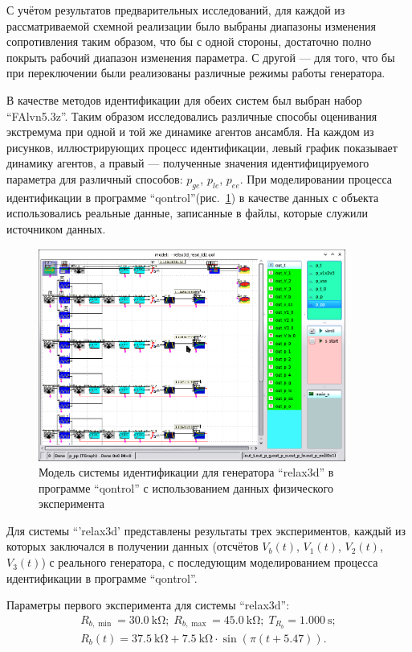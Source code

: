 С учётом результатов предварительных исследований,
для каждой из рассматриваемой схемной реализации было выбраны
диапазоны изменения сопротивления таким образом, что бы
с одной стороны,
достаточно полно покрыть рабочий диапазон изменения параметра.
С другой --- для того, что бы при переключении были реализованы
различные режимы работы генератора.

В качестве методов идентификации для обеих систем был выбран набор
``FAlvn5.3z''. Таким образом исследовались различные способы оценивания экстремума
при одной и той же динамике агентов ансамбля.
На каждом из рисунков, иллюстрирующих процесс идентификации,
левый график показывает динамику агентов, а правый --- полученные
значения идентифицируемого параметра для различный способов:
$p_{ge}$, $p_{le}$, $p_{ee}$.
При моделировании процесса идентификации в программе ``qontrol''(рис.~\ref{atu:f:relax3d_id_qontrol})
в качестве данных с объекта использовались реальные данные,
записанные в файлы, которые служили источником данных.

\begin{figure}[htb!]
  \centerline{\includegraphics[width=0.9\textwidth]{p/relax3d_id_qontrol.png} }
  \caption{Модель системы идентификации для генератора ``relax3d'' в программе ``qontrol'' с использованием данных физического эксперимента}
  \label{atu:f:relax3d_id_qontrol}
\end{figure}

Для системы ``'relax3d' представлены результаты трех экспериментов,
каждый из которых заключался в получении данных
(отсчётов $V_b(t)$, $V_1(t)$, $V_2(t)$, $V_3(t)$) с реального генератора,
с последующим моделированием процесса идентификации в программе ``qontrol''.

Параметры первого эксперимента для системы ``relax3d'':
%
\begin{equation}
  \begin{array}{c}
    R_{b,\min} = \SI{30.0}{\kilo\ohm};
    \;
    R_{b,\max} = \SI{45.0}{\kilo\ohm};
    \;
    T_{R_b} = \SI{1.000}{\second};
  \\
    R_b(t) = \SI{37.5}{\kilo\ohm} + \SI{7.5}{\kilo\ohm} \cdot \sin( \pi ( t + 5.47 ) ).
  \end{array}
  \label{atu:eq:relax3d_test1_cond}
\end{equation}

